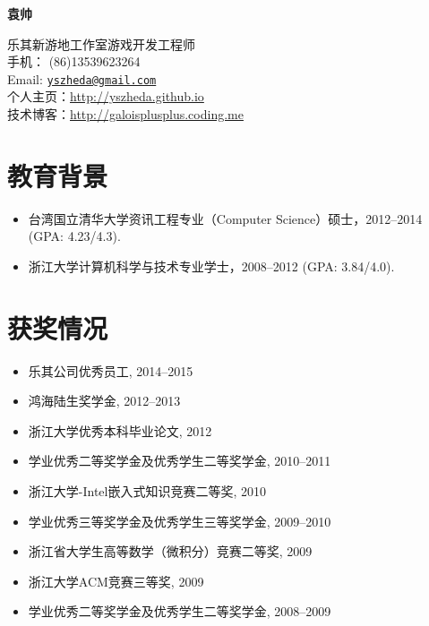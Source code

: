 \documentclass[letterpaper]{article}
\def\name{袁帅}
\begin{document}
\centerline{\huge\bf \name} \vspace{0.25in}
\begin{minipage}[t]{0.8\textwidth}
    乐其新游地工作室游戏开发工程师 \\
    手机： (86)13539623264   \\
    Email: \href{mailto:yszheda@gmail.com}{\tt yszheda@gmail.com}\\
    个人主页：\url{http://yszheda.github.io} \\
    技术博客：\url{http://galoisplusplus.coding.me}
\end{minipage}

\section*{教育背景}
\begin{itemize}
    \item 台湾国立清华大学资讯工程专业（Computer Science）硕士，2012--2014 (GPA: 4.23/4.3).
    \item 浙江大学计算机科学与技术专业学士，2008--2012 (GPA: 3.84/4.0).
\end{itemize}

\section*{获奖情况}
\begin{itemize}
    \item 乐其公司优秀员工, 2014--2015
    \item 鸿海陆生奖学金, 2012--2013				
    \item 浙江大学优秀本科毕业论文, 2012
    \item 学业优秀二等奖学金及优秀学生二等奖学金, 2010--2011
    \item 浙江大学-Intel嵌入式知识竞赛二等奖, 2010
    \item 学业优秀三等奖学金及优秀学生三等奖学金, 2009--2010
    \item 浙江省大学生高等数学（微积分）竞赛二等奖, 2009
    \item 浙江大学ACM竞赛三等奖, 2009
    \item 学业优秀二等奖学金及优秀学生二等奖学金, 2008--2009
\end{itemize}
\end{document}
